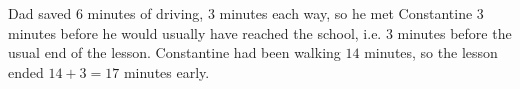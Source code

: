 Dad saved $6$ minutes of driving, $3$ minutes each way, so he met Constantine $3$ minutes before he would usually have reached the school, i.e. $3$ minutes before the usual end of the lesson. Constantine had been walking $14$ minutes, so the lesson ended $14+3=\boxed{17}$ minutes early.
